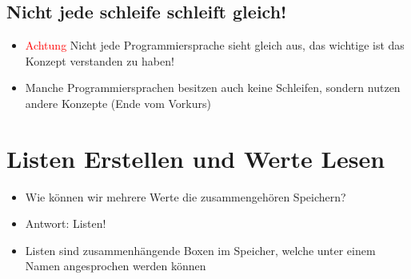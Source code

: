 \livecoding

\subsection{Nicht jede schleife schleift gleich!}
\begin{frame}
    \slidehead

    \begin{itemize}
        \item \textcolor{red}{Achtung} Nicht jede Programmiersprache sieht gleich aus, das wichtige ist das Konzept verstanden zu haben!
        \item Manche Programmiersprachen besitzen auch keine Schleifen, sondern nutzen andere Konzepte (Ende vom Vorkurs)
    \end{itemize}
\end{frame}

\section{Listen Erstellen und Werte Lesen}
\begin{frame}
    \slidehead

    \begin{itemize}
        \item Wie können wir mehrere Werte die zusammengehören Speichern?
        \item Antwort: Listen!
        \item Listen sind zusammenhängende Boxen im Speicher, welche unter einem Namen angesprochen werden können
    \end{itemize}

    \begin{center}
        \label{fig:figure}
    \end{center}

\end{frame}


